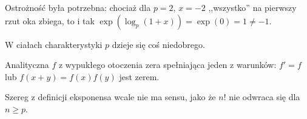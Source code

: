 Ostrożność była potrzebna: chociaż dla $p = 2$, $x = -2$ ,,wszystko'' na pierwszy rzut oka zbiega, to i tak $\exp(\log_p(1+x)) = \exp(0) = 1 \neq -1$.

W ciałach charakterystyki $p$ dzieje się coś niedobrego.
\begin{fakt}
	Analityczna  $f$ z wypukłego otoczenia zera spełniająca jeden z warunków: $f' = f$ lub $f(x+y) = f(x)f(y)$ jest zerem.
\end{fakt}

Szereg z definicji eksponensa wcale nie ma sensu, jako że $n!$ nie odwraca się dla $n \ge p$.